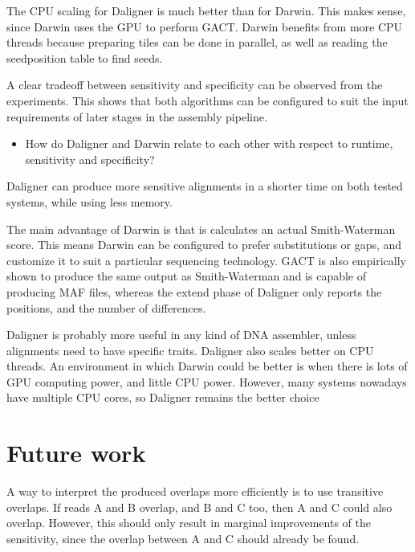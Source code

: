 \documentclass[../thesis.tex]{subfiles}
\begin{document}
The CPU scaling for Daligner is much better than for Darwin.
This makes sense, since Darwin uses the GPU to perform GACT.
Darwin benefits from more CPU threads because preparing tiles can be done in parallel, as well as reading the seedposition table to find seeds.

A clear tradeoff between sensitivity and specificity can be observed from the experiments.
This shows that both algorithms can be configured to suit the input requirements of later stages in the assembly pipeline.



\begin{itemize}
\item How do Daligner and Darwin relate to each other with respect to runtime, sensitivity and specificity?
\end{itemize}
Daligner can produce more sensitive alignments in a shorter time on both tested systems, while using less memory.

The main advantage of Darwin is that is calculates an actual Smith-Waterman score.
This means Darwin can be configured to prefer substitutions or gaps, and customize it to suit a particular sequencing technology.
GACT is also empirically shown to produce the same output as Smith-Waterman and is capable of producing MAF files, whereas the extend phase of Daligner only reports the positions, and the number of differences.

Daligner is probably more useful in any kind of DNA assembler, unless alignments need to have specific traits.
Daligner also scales better on CPU threads.
An environment in which Darwin could be better is when there is lots of GPU computing power, and little CPU power.
However, many systems nowadays have multiple CPU cores, so Daligner remains the better choice 

\section{Future work}





A way to interpret the produced overlaps more efficiently is to use transitive overlaps.
If reads A and B overlap, and B and C too, then A and C could also overlap.
However, this should only result in marginal improvements of the sensitivity, since the overlap between A and C should already be found.
\end{document}
